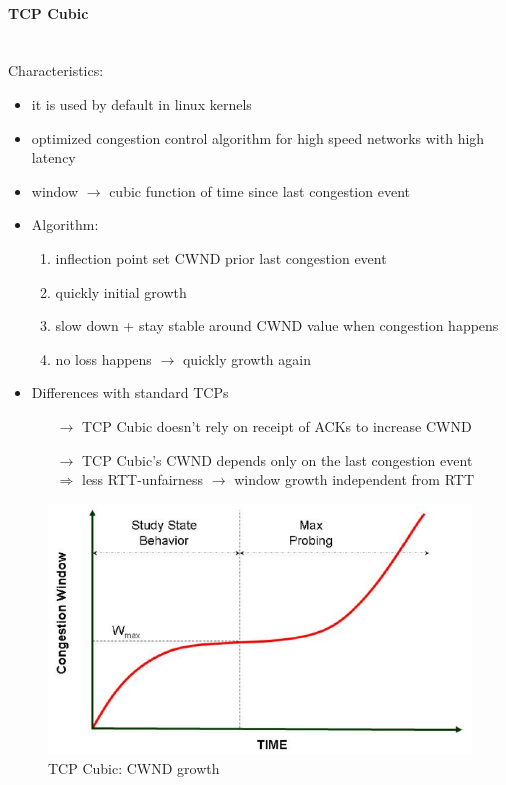 \paragraph{TCP Cubic}\mbox{}\\[0.2cm]
Characteristics:
\begin{itemize}
    \item it is used by default in linux kernels
    \item optimized congestion control algorithm for high speed networks with high latency
    \item window $\rightarrow$ cubic function of time since last congestion event
    \item Algorithm:
    \begin{enumerate}
        \item inflection point set CWND prior last congestion event
        \item quickly initial growth
        \item slow down + stay stable around CWND value when congestion happens
        \item no loss happens $\rightarrow$ quickly growth again
    \end{enumerate}
    \item Differences with standard TCPs
    \begin{itemize}
        \item[$\rightarrow$] TCP Cubic doesn't rely on receipt of ACKs to increase CWND
        \item[$\rightarrow$] TCP Cubic's CWND depends only on the last congestion event\\
        $\Rightarrow$ less RTT-unfairness $\rightarrow$ window growth independent from RTT
    \end{itemize}
\end{itemize}
\begin{figure}[!h] 
    \centering 
    \includegraphics[scale = 0.4]{images/cwnd-growth-tcp-cubic.png} 
    \caption{TCP Cubic: CWND growth}
    \label{cwnd-growth-tcp-cubic}
\end{figure}